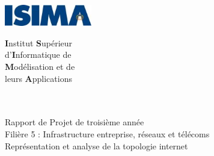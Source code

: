 \begin{titlepage}
	\begin{minipage}{0.5\textwidth}
		\begin{flushleft} \large
			\includegraphics[width=3.8cm]{./schema/logo-isima.jpg}\\
		\end{flushleft}
	\end{minipage}
	\begin{minipage}{0.43\textwidth}
		\begin{flushright} \large
		\end{flushright}
	\end{minipage}

	\begin{minipage}{0.5\textwidth}
		\begin{flushleft} \large
			\textbf{I}nstitut \textbf{S}upérieur\\
			d'\textbf{I}nformatique de\\
			\textbf{M}odélisation et de\\
			leurs \textbf{A}pplications\\
			~\\
		\end{flushleft}
	\end{minipage}
	\begin{minipage}{0.43\textwidth}
		\begin{flushright} \large
		\end{flushright}
	\end{minipage}


		\vfill
		\begin{center}
			\Hrule \\[0.4cm]
			\Large{Rapport de Projet de troisième année}\\		
			\Large Filière 5 : Infrastructure entreprise, réseaux et télécoms\\[1.0cm]
			\Huge{Représentation et analyse de la topologie internet}\\
			\Hrule\\[0.8cm]
\vfill 
		\end{center}
		

\end{titlepage}
